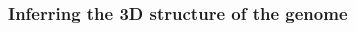 \documentclass[11pt,xcolor=dvipsnames]{beamer}
\begin{document}
\begin{frame}
\frametitle{Inferring the 3D structure of the genome}

\begin{overlayarea}{12cm}{4cm}
\end{overlayarea}


\end{frame}
\end{document}
